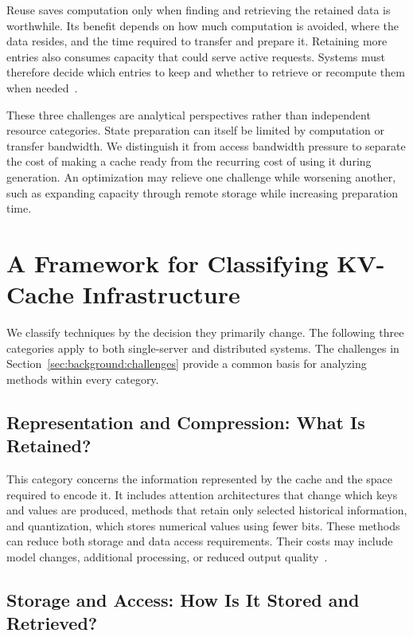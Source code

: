 Reuse saves computation only when finding and retrieving the retained data is worthwhile. Its benefit depends on how much computation is avoided, where the data resides, and the time required to transfer and prepare it. Retaining more entries also consumes capacity that could serve active requests. Systems must therefore decide which entries to keep and whether to retrieve or recompute them when needed~\cite{kv_qin2025mooncake}.

These three challenges are analytical perspectives rather than independent resource categories. State preparation can itself be limited by computation or transfer bandwidth. We distinguish it from access bandwidth pressure to separate the cost of making a cache ready from the recurring cost of using it during generation. An optimization may relieve one challenge while worsening another, such as expanding capacity through remote storage while increasing preparation time.

\section{A Framework for Classifying KV-Cache Infrastructure}\label{sec:background:taxonomy}

We classify techniques by the decision they primarily change. The following three categories apply to both single-server and distributed systems. The challenges in Section~\ref{sec:background:challenges} provide a common basis for analyzing methods within every category.

\subsection{Representation and Compression: What Is Retained?}

This category concerns the information represented by the cache and the space required to encode it. It includes attention architectures that change which keys and values are produced, methods that retain only selected historical information, and quantization, which stores numerical values using fewer bits. These methods can reduce both storage and data access requirements. Their costs may include model changes, additional processing, or reduced output quality~\cite{kv_ainslie2023gqa,kv_liu2024kivi}.

\subsection{Storage and Access: How Is It Stored and Retrieved?}

